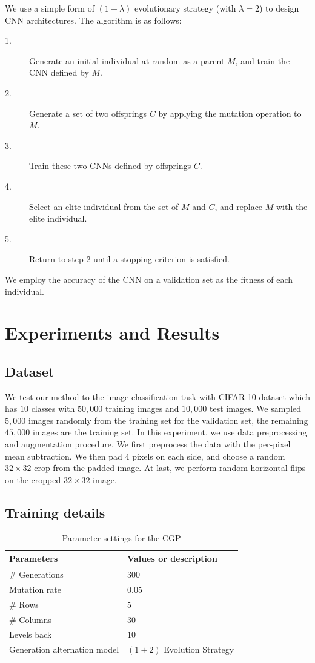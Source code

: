 We use a simple form of $(1+\lambda)$ evolutionary strategy (with $\lambda = 2$) to design CNN architectures.
The algorithm is as follows:
\begin{description}
  \item[1.] Generate an initial individual at random as a parent $M$, and train the CNN defined by $M$.
  \item[2.] Generate a set of two offsprings $C$ by applying the mutation operation to $M$.
  \item[3.] Train these two CNNs defined by offsprings $C$.
  \item[4.] Select an elite individual from the set of $M$ and $C$, and replace $M$ with the elite individual.
  \item[5.] Return to step $2$ until a stopping criterion is satisfied.
\end{description}
We employ the accuracy of the CNN on a validation set as the fitness of each individual.

\section{Experiments and Results}
\subsection{Dataset}
We test our method to the image classification task with CIFAR-10 dataset which has $10$ classes with $50,000$ training images and $10,000$ test images.
We sampled $5,000$ images randomly from the training set for the validation set, the remaining $45,000$ images are the training set.
In this experiment, we use data preprocessing and augmentation procedure.
We first preprocess the data with the per-pixel mean subtraction.
We then pad $4$ pixels on each side, and choose a random $32\times 32$ crop from the padded image.
At last, we perform random horizontal flips on the cropped $32 \times 32$ image. 
\subsection{Training details}

\begin{table}[tb]
  \caption{Parameter settings for the CGP}
  \label{cgp_param}
  \begin{tabular}{l|l} \hline
    Parameters & Values or description \\ \hline
   \# Generations & $300$ \\ 
   Mutation rate & $0.05$ \\
   \#  Rows & $5$ \\
   \#  Columns & $30$ \\
   Levels back & $10$ \\
   Generation alternation model & $(1+2)$ Evolution Strategy \\ \hline
  \end{tabular}
\end{table}

